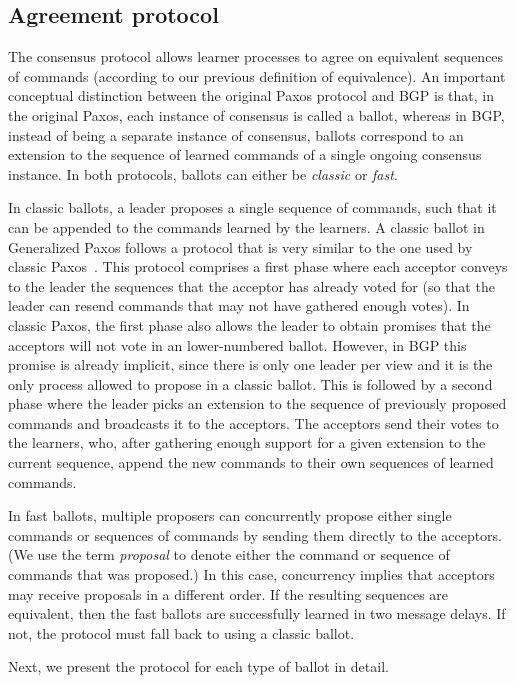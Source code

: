 \subsection{Agreement protocol} 

The consensus protocol allows learner processes to agree on equivalent sequences of commands (according to our previous definition of equivalence).
An important conceptual distinction between the original Paxos protocol and BGP is that, in the original Paxos, each instance of consensus is called a ballot, whereas in BGP, instead of being a separate instance of consensus, 
ballots correspond to an extension to the sequence of learned commands of a single ongoing consensus instance.
In both protocols, ballots can either be \textit{classic} or \textit{fast}. 


In classic ballots, a leader proposes a single sequence of commands, such that it can be appended to the commands learned by the learners. 
A classic ballot in Generalized Paxos follows a protocol that is very similar to the one used by classic Paxos~\cite{Lam98}. This protocol comprises a first phase where each acceptor conveys to the leader the sequences that the acceptor has already voted for (so that the leader can resend commands that may not have gathered enough votes). In classic Paxos, the first phase also allows the leader to obtain promises that the acceptors will not vote in an lower-numbered ballot. However, in BGP this promise is already implicit, since there is only one leader per view and it is the only process allowed to propose in a classic ballot. This is followed by a second phase where the leader picks an extension to the sequence of previously proposed commands and broadcasts it to the acceptors. The acceptors send their votes to the learners, who, after gathering enough support for a given extension to the current sequence, append the new commands to their own sequences of learned commands.

In fast ballots, multiple proposers can concurrently propose either single commands or sequences of commands by sending them directly to the acceptors. (We use the term \textit{proposal} to denote either the command or sequence of commands that was proposed.)
In this case, concurrency implies that acceptors may receive proposals in a different order. If the resulting sequences are equivalent, then the fast ballots are successfully learned in two message delays. If not, the protocol must fall back to using a classic ballot.

Next, we present the protocol for each type of ballot in detail.

